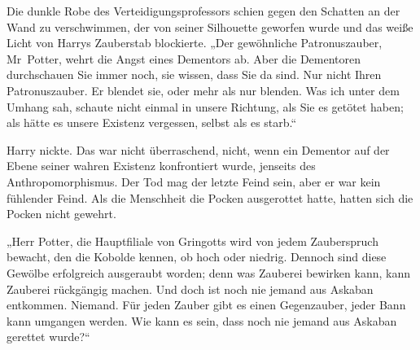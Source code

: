 Die dunkle Robe des Verteidigungsprofessors schien gegen den Schatten an der Wand zu verschwimmen, der von seiner Silhouette geworfen wurde und das weiße Licht von Harrys Zauberstab blockierte. „Der gewöhnliche Patronuszauber, Mr~Potter, wehrt die Angst eines Dementors ab. Aber die Dementoren durchschauen Sie immer noch, sie wissen, dass Sie da sind. Nur nicht Ihren Patronuszauber. Er blendet sie, oder mehr als nur blenden. Was ich unter dem Umhang sah, schaute nicht einmal in unsere Richtung, als Sie es getötet haben; als hätte es unsere Existenz vergessen, selbst als es starb.“

Harry nickte. Das war nicht überraschend, nicht, wenn ein Dementor auf der Ebene seiner wahren Existenz konfrontiert wurde, jenseits des Anthropomorphismus. Der Tod mag der letzte Feind sein, aber er war kein fühlender Feind. Als die Menschheit die Pocken ausgerottet hatte, hatten sich die Pocken nicht gewehrt.

„Herr Potter, die Hauptfiliale von Gringotts wird von jedem Zauberspruch bewacht, den die Kobolde kennen, ob hoch oder niedrig. Dennoch sind diese Gewölbe erfolgreich ausgeraubt worden; denn was Zauberei bewirken kann, kann Zauberei rückgängig machen. Und doch ist noch nie jemand aus Askaban entkommen. Niemand. Für jeden Zauber gibt es einen Gegenzauber, jeder Bann kann umgangen werden. Wie kann es sein, dass noch nie jemand aus Askaban gerettet wurde?“


